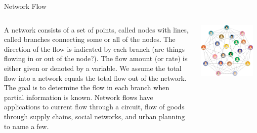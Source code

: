 \documentclass[xcolor=dvipsnames,aspectratio=169,t]{beamer}
\begin{document}
\begin{frame}{Network Flow}

  \begin{columns}
    \column{0.65\tw}
    {\small
  \bi
  \ii A \alert{network} consists of a set of points, called \alert{nodes} with lines, called \alert{branches} connecting some or all of the nodes.
  \ii The direction of the flow is indicated by each branch (are things flowing in or out of the node?).
  \ii The flow amount (or rate) is either given or denoted by a variable.
  \ii We assume the total flow into a network equals the total flow out of the network.
  \ii The goal is to determine the flow in each branch when partial information is known.
  \ii Network flows have applications to current flow through a circuit, flow of goods through supply chains, social networks, and \alert{urban planning} to name a few.
  \ei
    }
    
  \column{0.35\tw}

  \includegraphics[width=0.95\tw]{images/fig-social-network.png}
  \smallskip
  

  \end{columns}

  \end{frame}
\end{document}
